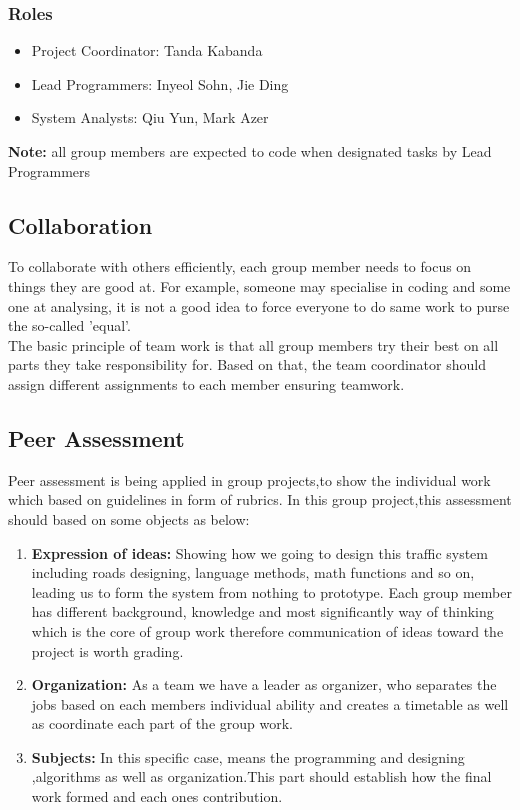 \documentclass[a4paper,11pt]{article}
\begin{document}
\subsubsection[short]{Roles}

\begin{itemize}%
	\item Project Coordinator: Tanda Kabanda
	\item Lead Programmers: Inyeol Sohn, Jie Ding
	\item System Analysts: Qiu Yun, Mark Azer
\end{itemize}

\textbf{Note:} all group members are expected to code when designated tasks by Lead Programmers

\subsection{Collaboration}%
To collaborate with others efficiently, each group member needs to focus on things they are good at. For example, someone may specialise in coding and some one at analysing, it is not a good idea to force everyone to do same work to purse the so-called 'equal'.\\The basic principle of team work is that all group members try their best on all parts they take responsibility for. Based on that, the team coordinator should assign different assignments to each member ensuring teamwork.

\subsection{Peer Assessment}%
Peer assessment is being applied in group projects,to show the individual work which based on guidelines in form of rubrics. In this group project,this assessment should based on some objects as below:

\begin{enumerate}
\item \textbf{Expression of ideas:} Showing how we going to design this traffic system including roads designing, language methods, math functions and so on, leading us to form the system from nothing to prototype. Each group member has different background, knowledge and most significantly way of thinking which is the core of group work therefore communication of ideas toward the project is worth grading.  
\item \textbf{Organization:} As a team we have a leader as organizer, who separates the jobs based on each members individual ability and creates a timetable as well as coordinate each part of the group work.
\item \textbf{Subjects:} In this specific case, means the programming and designing ,algorithms as well as organization.This part should establish how the final work formed and each ones contribution.

\end{enumerate}
\end{document}
